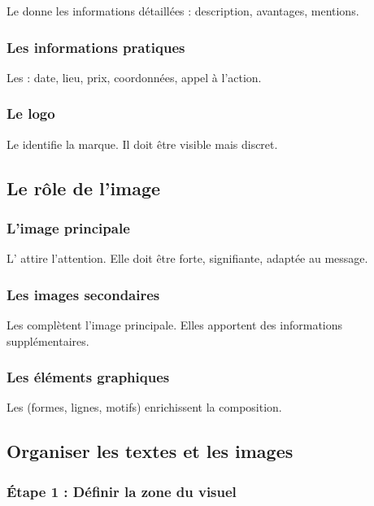 Le  donne les informations détaillées : description, avantages, mentions.

\subsubsection{Les informations pratiques}

Les  : date, lieu, prix, coordonnées, appel à l'action.

\subsubsection{Le logo}

Le  identifie la marque. Il doit être visible mais discret.

\subsection{Le rôle de l'image}

\subsubsection{L'image principale}

L' attire l'attention. Elle doit être forte, signifiante, adaptée au message.

\subsubsection{Les images secondaires}

Les  complètent l'image principale. Elles apportent des informations supplémentaires.

\subsubsection{Les éléments graphiques}

Les  (formes, lignes, motifs) enrichissent la composition.

\subsection{Organiser les textes et les images}

\subsubsection{Étape 1 : Définir la zone du visuel}

